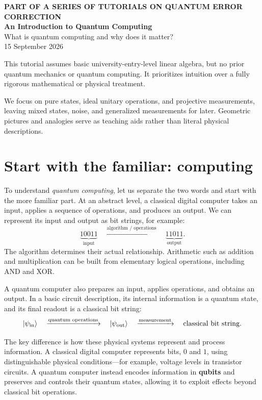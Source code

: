 \documentclass[11pt,a4paper]{article}
\newcommand{\ket}[1]{\lvert #1\rangle}
\begin{document}
\begin{center}
{\small\color{teal}\textbf{PART OF A SERIES OF TUTORIALS ON QUANTUM ERROR CORRECTION}}\\[9pt]
{\LARGE\bfseries\color{ink} An Introduction to Quantum Computing}\\[10pt]
{\large What is quantum computing and why does it matter?}\\[9pt]
{\small 15 September 2026}
\end{center}
\vspace{3pt}
This tutorial assumes basic university-entry-level linear algebra, but no prior quantum mechanics or quantum computing. It prioritizes intuition over a fully rigorous mathematical or physical treatment.

We focus on pure states, ideal unitary operations, and projective measurements, leaving mixed states, noise, and generalized measurements for later. Geometric pictures and analogies serve as teaching aids rather than literal physical descriptions.

\section{Start with the familiar: computing}
To understand \emph{quantum computing}, let us separate the two words and start with the more familiar part. At an abstract level, a classical digital computer takes an input, applies a sequence of operations, and produces an output. We can represent its input and output as bit strings, for example:
\[
\underbrace{10011}_{\text{input}}
\quad\xrightarrow{\text{algorithm / operations}}\quad
\underbrace{11011}_{\text{output}}.
\]
The algorithm determines their actual relationship. Arithmetic such as addition and multiplication can be built from elementary logical operations, including AND and XOR. 

A quantum computer also prepares an input, applies operations, and obtains an output. In a
basic circuit description, its internal information is a quantum state, and its final readout is a
classical bit string:
\[
\ket{\psi_{\rm in}}
\quad\xrightarrow{\text{quantum operations}}\quad
\ket{\psi_{\rm out}}
\quad\xrightarrow{\text{measurement}}\quad
\text{classical bit string}.
\]

The key difference is how these physical systems represent and process information. A classical digital computer represents bits, \(0\) and \(1\), using distinguishable physical conditions---for example, voltage levels in transistor circuits. A quantum computer instead encodes information in \textbf{qubits} and preserves and controls their quantum states, allowing it to exploit effects beyond classical bit operations.
\end{document}
